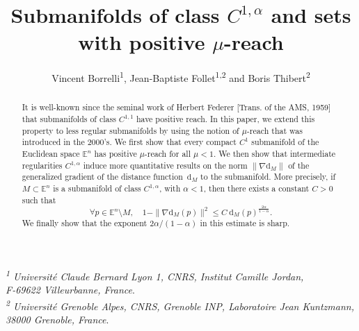 \documentclass[11pt,reqno,a4paper]{article}%
\title{Submanifolds of class $C^{1,\alpha}$ and sets with positive $\mu$-reach}
\author{
Vincent Borrelli\textsuperscript{1}, Jean-Baptiste Follet\textsuperscript{1,2} and Boris Thibert\textsuperscript{2}
}
\theoremstyle{definition}
\theoremstyle{remark}
\renewcommand{\leq}{\leqslant}
\renewcommand{\d}{\mathrm{d}}
\newcommand{\E}{\mathbb{E}}
\newcommand{\jb}[1]{\textcolor{blue}{#1}}
\renewcommand{\d}{\mathrm{d}}
\begin{document}
\maketitle
\begin{center}
\emph{\textsuperscript{1} Université Claude Bernard Lyon 1, CNRS, Institut Camille Jordan,\\ F-69622 Villeurbanne, France}.\\
\emph{\textsuperscript{2} Université Grenoble Alpes, CNRS, Grenoble INP, Laboratoire Jean Kuntzmann,\\ 38000 Grenoble, France}.\\
\end{center}
\begin{abstract}


It is well-known since the seminal work of Herbert Federer [Trans. of the AMS, 1959] that submanifolds of class $C^{1,1}$ have positive reach. In this paper, we extend this property to less regular submanifolds by using the notion of $\mu$-reach that was introduced in the 2000's. We first show that every compact $C^1$ submanifold of the Euclidean space $\E^n$ has positive 
$\mu$-reach for all $\mu<1$. We then show that intermediate regularities $C^{1,\alpha}$ induce more quantitative results on the norm $\|\nabla \d_M\|$ of the generalized gradient of the distance function~$\d_M$ to the submanifold. More precisely, if $M\subset \E^n$ is a submanifold of class $C^{1,\alpha}$, with $\alpha<1$, then there exists a constant $C>0$ such that 
 $$\forall p\in\E^n\setminus M,\quad 1 - \| \nabla \d_M(p) \|^2  \leq C ~ \d_M(p)^{\frac{2 \alpha}{1- \alpha}}.$$
We finally show that the exponent $2\alpha/(1-\alpha)$ in this estimate is sharp.
\end{abstract}

\tableofcontents

\end{document}
